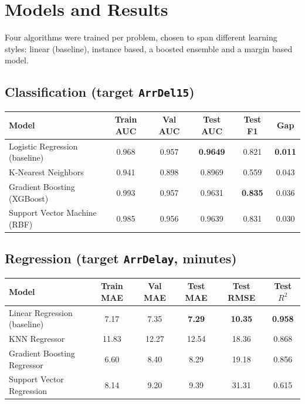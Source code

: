 \documentclass[11pt,a4paper]{article}
\begin{document}
\section{Models and Results}

Four algorithms were trained per problem, chosen to span different learning styles:
linear (baseline), instance based, a boosted ensemble and a margin based model.

\subsection*{Classification (target \texttt{ArrDel15})}

\begin{center}
\small
\begin{tabular}{@{}l c c c c c@{}}
\toprule
\textbf{Model} & \textbf{Train AUC} & \textbf{Val AUC} & \textbf{Test AUC} &
\textbf{Test F1} & \textbf{Gap} \\
\midrule
Logistic Regression (baseline) & 0.968 & 0.957 & \textbf{0.9649} & 0.821 & \textbf{0.011} \\
K-Nearest Neighbors            & 0.941 & 0.898 & 0.8969 & 0.559 & 0.043 \\
Gradient Boosting (XGBoost)    & 0.993 & 0.957 & 0.9631 & \textbf{0.835} & 0.036 \\
Support Vector Machine (RBF)   & 0.985 & 0.956 & 0.9639 & 0.831 & 0.030 \\
\bottomrule
\end{tabular}
\end{center}

\subsection*{Regression (target \texttt{ArrDelay}, minutes)}

\begin{center}
\small
\begin{tabular}{@{}l c c c c c@{}}
\toprule
\textbf{Model} & \textbf{Train MAE} & \textbf{Val MAE} & \textbf{Test MAE} &
\textbf{Test RMSE} & \textbf{Test $R^2$} \\
\midrule
Linear Regression (baseline)  & 7.17 & 7.35 & \textbf{7.29} & \textbf{10.35} & \textbf{0.958} \\
KNN Regressor                 & 11.83 & 12.27 & 12.54 & 18.36 & 0.868 \\
Gradient Boosting Regressor   & 6.60 & 8.40 & 8.29 & 19.18 & 0.856 \\
Support Vector Regression     & 8.14 & 9.20 & 9.39 & 31.31 & 0.615 \\
\bottomrule
\end{tabular}
\end{center}
\end{document}
